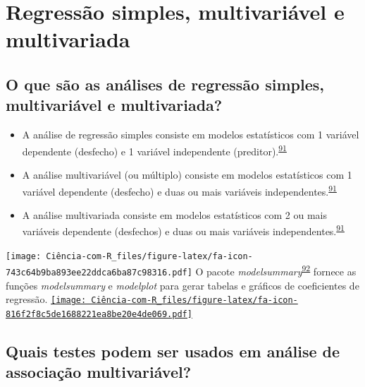 \documentclass[
]{book}
\begin{document}
\hypertarget{multivariavel-multivariada}{%
\section{Regressão simples, multivariável e multivariada}\label{multivariavel-multivariada}}

\hypertarget{o-que-suxe3o-as-anuxe1lises-de-regressuxe3o-simples-multivariuxe1vel-e-multivariada}{%
\subsection{O que são as análises de regressão simples, multivariável e multivariada?}\label{o-que-suxe3o-as-anuxe1lises-de-regressuxe3o-simples-multivariuxe1vel-e-multivariada}}

\begin{itemize}
\item
  A análise de regressão simples consiste em modelos estatísticos com 1 variável dependente (desfecho) e 1 variável independente (preditor).\textsuperscript{\protect\hyperlink{ref-Hidalgo2013}{91}}
\item
  A análise multivariável (ou múltiplo) consiste em modelos estatísticos com 1 variável dependente (desfecho) e duas ou mais variáveis independentes.\textsuperscript{\protect\hyperlink{ref-Hidalgo2013}{91}}
\item
  A análise multivariada consiste em modelos estatísticos com 2 ou mais variáveis dependente (desfechos) e duas ou mais variáveis independentes.\textsuperscript{\protect\hyperlink{ref-Hidalgo2013}{91}}
\end{itemize}

\texttt{[image: Ciência-com-R\_files/figure-latex/fa-icon-743c64b9ba893ee22ddca6ba87c98316.pdf]} O pacote \emph{modelsummary}\textsuperscript{\protect\hyperlink{ref-modelsummary}{92}} fornece as funções \emph{modelsummary} e \emph{modelplot} para gerar tabelas e gráficos de coeficientes de regressão. \href{https://cloud.r-project.org/web/packages/modelsummary/index.html}{\texttt{[image: Ciência-com-R\_files/figure-latex/fa-icon-816f2f8c5de1688221ea8be20e4de069.pdf]}}

\hypertarget{quais-testes-podem-ser-usados-em-anuxe1lise-de-associauxe7uxe3o-multivariuxe1vel}{%
\subsection{Quais testes podem ser usados em análise de associação multivariável?}\label{quais-testes-podem-ser-usados-em-anuxe1lise-de-associauxe7uxe3o-multivariuxe1vel}}
\end{document}

